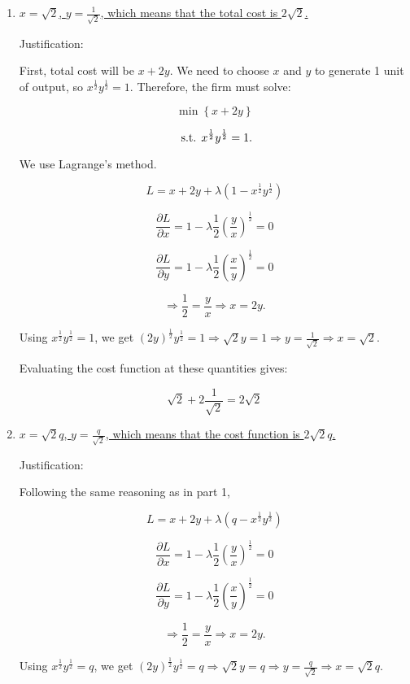 \documentclass{article}
\newcommand{\st}{\hbox{ s.t. }}
\newenvironment{solution}{\color{red}}{\color{black}}
\begin{document}
\begin{solution}

\begin{enumerate}
\item\underline{$x=\sqrt{2}$, $y=\frac{1}{\sqrt{2}}$, which means that the total cost is $2\sqrt{2}$.}

Justification:

First, total cost will be $x+2y$. We need to choose $x$ and $y$ to generate 1 unit of output, so $x^\frac12 y^\frac12 = 1$. Therefore, the firm must solve:

\[ \min \left\{ x + 2y \right\} \]

\[ \st x^\frac12 y^\frac12 = 1. \]

We use Lagrange's method.

\[ L = x+2y + \lambda\left( 1-x^\frac12 y^\frac12 \right) \]

\[ \frac{\partial L}{\partial x}=1-\lambda\frac12\left( \frac{y}{x} \right)^\frac12=0 \]

\[ \frac{\partial L}{\partial y}=1-\lambda\frac12\left( \frac{x}{y} \right)^\frac12=0 \]

\[ \Rightarrow \frac12=\frac{y}{x} \Rightarrow x=2y. \]

Using $x^\frac12 y^\frac12=1$, we get $(2y)^\frac12 y^\frac12 =1 \Rightarrow  \sqrt{2}y=1 \Rightarrow  y=\frac{1}{\sqrt{2}} \Rightarrow x=\sqrt{2}$.

Evaluating the cost function at these quantities gives:

\[ \sqrt{2}+2\frac{1}{\sqrt{2}}=2\sqrt{2} \]

\item\underline{$x=\sqrt{2}q$, $y=\frac{q}{\sqrt{2}}$, which means that the cost function is $2\sqrt{2}q$.}

Justification:

Following the same reasoning as in part 1,

\[ L=x+2y+\lambda \left( q-x^\frac12 y^\frac12 \right) \]

\[ \frac{\partial L}{\partial x}=1-\lambda\frac12\left( \frac{y}{x} \right)^\frac12=0 \]

\[ \frac{\partial L}{\partial y}=1-\lambda\frac12\left( \frac{x}{y} \right)^\frac12=0 \]

\[ \Rightarrow \frac12=\frac{y}{x} \Rightarrow x=2y. \]

Using $x^\frac12 y^\frac12=q$, we get $(2y)^\frac12 y^\frac12 =q \Rightarrow  \sqrt{2}y=q \Rightarrow  y=\frac{q}{\sqrt{2}} \Rightarrow x=\sqrt{2}q$.


\end{enumerate}
\end{solution}
\end{document}
